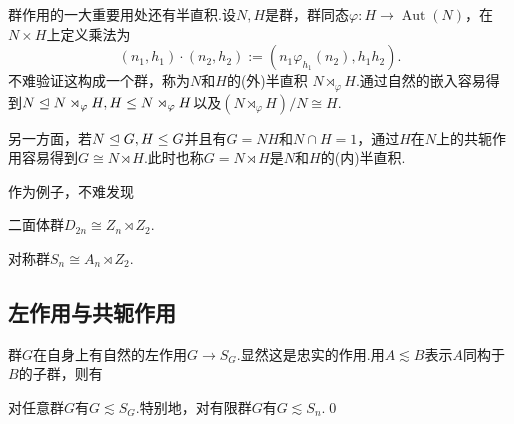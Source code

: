 群作用的一大重要用处还有\hypertarget{text:Semidirect}{半直积}.设$N,H$是群，群同态$\varphi\colon H\to\operatorname*{Aut}(N)$，在$N\times H$上定义乘法为
\[
	(n_1,h_1)\cdot(n_2,h_2):=(n_1\varphi_{h_1}(n_2),h_1h_2).
\]
不难验证这构成一个群，称为$N$和$H$的{\heiti (外)半直积} $N\rtimes_\varphi H$.通过自然的嵌入容易得到$N\trianglelefteq N\rtimes_\varphi H,H\le N\rtimes_\varphi H$以及$(N\rtimes_\varphi H)/N\cong H$.

另一方面，若$N\trianglelefteq G,H\le G$并且有$G=NH$和$N\cap H=1$，通过$H$在$N$上的共轭作用容易得到$G\cong N\rtimes H$.此时也称$G=N\rtimes H$是$N$和$H$的{\heiti (内)半直积}.

作为例子，不难发现
\par\begin{itemize*}
	\item 二面体群$D_{2n}\cong Z_n\rtimes Z_2$.\phantom{\qquad}
	\item 对称群$S_n\cong A_n\rtimes Z_2$.
\end{itemize*}

\subsection{左作用与共轭作用}
群$G$在自身上有自然的左作用$G\to S_G$.显然这是忠实的作用.用$A\lesssim B$表示$A$同构于$B$的子群，则有
\begin{thm}[(Cayley)]
	对任意群$G$有$G\lesssim S_G$.特别地，对有限群$G$有$G\lesssim S_n$.\qed\hypertarget{thm:Cayley}{}
\end{thm}

